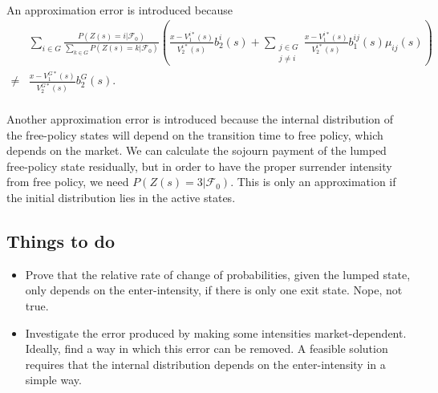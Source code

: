 \documentclass[12pt]{article}
\theoremstyle{my_thm}
\begin{document}
\\[12pt]
An approximation error is introduced because
\begin{align*}
&\sum_{i \in G}\frac{P(Z(s)=i|\mathcal{F}_0)}{\sum_{k \in G}P(Z(s)=k|\mathcal{F}_0)}  \left( \frac{x-V_1^{i*}(s)}{V_2^{i*}(s)} b_2^i(s) + \sum_{ \substack{j \in G \\j \neq i}} \frac{x-V_1^{i*}(s)}{V_2^{i*}(s)}b_1^{ij}(s) \mu_{ij}(s) \right)
\\
\neq &
\frac{x-V_1^{G*}(s)}{V_2^{G*}(s)}b_2^G(s).
\end{align*}
\\[12pt]
Another approximation error is introduced because the internal distribution of the free-policy states will depend on the transition time to free policy, which depends on the market. We can calculate the sojourn payment of the lumped free-policy state residually, but in order to have the proper surrender intensity from free policy, we need $P(Z(s)=3|\mathcal{F}_0)$. This is only an approximation if the initial distribution lies in the active states.
\\[12pt]
\subsection*{Things to do}
\begin{itemize}
\item Prove that the relative rate of change of probabilities, given the lumped state, only depends on the enter-intensity, if there is only one exit state. Nope, not true.
\item Investigate the error produced by making some intensities market-dependent. Ideally, find a way in which this error can be removed. A feasible solution requires that the internal distribution depends on the enter-intensity in a simple way. 
\end{itemize}





\newpage


\end{document}
